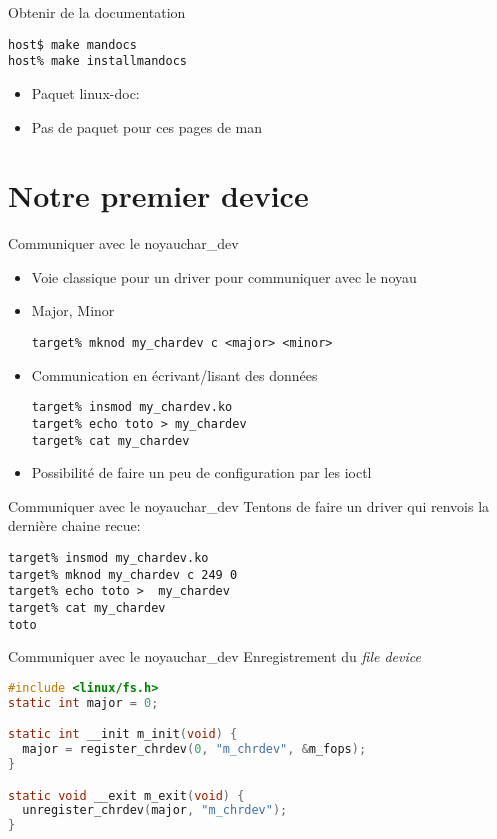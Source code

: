 \begin{frame}[fragile=singleslide]{Obtenir de la documentation}
  \begin{lstlisting}
host$ make mandocs
host% make installmandocs
  \end{lstlisting}  %
  \begin{itemize}
    \item Paquet linux-doc: 
    \item Pas de paquet pour ces pages de man
  \end{itemize}
\end{frame}

\section{Notre premier device}

\begin{frame}[fragile=singleslide]{Communiquer avec le noyau}{char\_dev}
  \begin{itemize}
  \item Voie classique pour un driver pour communiquer avec le noyau
  \item Major, Minor
    \begin{lstlisting}
target% mknod my_chardev c <major> <minor>
    \end{lstlisting}
  \item Communication en écrivant/lisant des données
    \begin{lstlisting}
target% insmod my_chardev.ko
target% echo toto > my_chardev
target% cat my_chardev
    \end{lstlisting}
  \item Possibilité de faire un peu de configuration par les ioctl
  \end{itemize}
\end{frame}

\begin{frame}[fragile=singleslide]{Communiquer avec le noyau}{char\_dev}
  Tentons de faire un driver qui renvois la dernière chaine recue:
  \begin{lstlisting}
target% insmod my_chardev.ko
target% mknod my_chardev c 249 0
target% echo toto >  my_chardev
target% cat my_chardev
toto
  \end{lstlisting}
\end{frame}

\begin{frame}[fragile=singleslide]{Communiquer avec le noyau}{char\_dev}
  Enregistrement du \emph{file device}
  \begin{lstlisting}[language=c]
#include <linux/fs.h>
static int major = 0;

static int __init m_init(void) {
  major = register_chrdev(0, "m_chrdev", &m_fops);
}

static void __exit m_exit(void) {
  unregister_chrdev(major, "m_chrdev");
}

  \end{lstlisting}
\end{frame}


